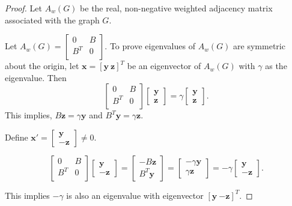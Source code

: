 \documentclass[10pt,a4paper,oneside]{article}
\begin{document}
\begin{proof}
Let $A_w(G)$ be the real, non-negative weighted adjacency matrix associated with the graph $G.$ 
	
Let $A_w(G)=\begin{bmatrix}
0 & B\\
B^T & 0\\
\end{bmatrix}.$ To prove eigenvalues of $A_w(G)$ are symmetric about the origin,	let $\mathbf{x}=[\mathbf{y}\ \mathbf{z}]^{T}$ be an eigenvector of $A_{w}(G)$ with $\gamma$ as the eigenvalue. Then $$\begin{bmatrix}
		0 & B\\
		B^{T} & 0\\
	\end{bmatrix}\begin{bmatrix}
		\mathbf{y}\\\mathbf{z}
	\end{bmatrix}=\gamma \begin{bmatrix}
		\mathbf{y}\\\mathbf{z}
	\end{bmatrix}.$$
	This implies, $B\mathbf{z}=\gamma \mathbf{y}$ and $B^T \mathbf{y}=\gamma \mathbf{z}.$
	
	Define $\mathbf{x'}=\begin{bmatrix}
		\mathbf{y} \\\mathbf{-z}
	\end{bmatrix}\neq 0.$
	
	$$\begin{bmatrix}
		0 & B\\
		B^{T} & 0\\
	\end{bmatrix}\begin{bmatrix}
		\mathbf{y}\\\mathbf{-z}
	\end{bmatrix}=\begin{bmatrix}
		-B\mathbf{z}\\B^{T}\mathbf{y}
	\end{bmatrix}=\begin{bmatrix}
		-\gamma \mathbf{y}\\\gamma
        \mathbf{z}
	\end{bmatrix}=-\gamma \begin{bmatrix}
		\mathbf{y}\\\mathbf{-z}
	\end{bmatrix}.$$
	
	This implies $-\gamma$ is also an eigenvalue with eigenvector $[\mathbf{y}\ \mathbf{-z}]^{T}.$


\end{proof}
\end{document}
